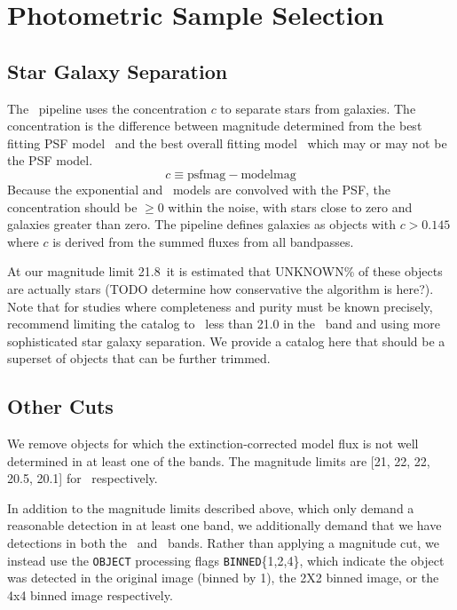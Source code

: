 \documentclass{emulateapj}
\newcommand{\rmax}{21.8}
\newcommand{\contam}{{\color{red} UNKNOWN}}
\begin{document}
\section{Photometric Sample Selection} \label{sec:select}

\subsection{Star Galaxy Separation}

The \photo\ pipeline uses the concentration $c$ to separate stars from
galaxies.  The concentration is the difference between magnitude determined
from the best fitting PSF model \psfmag\ and the best overall fitting model 
\modelmag\ which may or may not be the PSF model.
\begin{equation}
c \equiv \textrm{psfmag} - \textrm{modelmag}
\end{equation}
Because the exponential and \devauc\ models are convolved with the PSF, the
concentration should be $\ge 0$ within the noise, with stars close to zero and
galaxies greater than zero.  The pipeline defines galaxies as objects with $c >
0.145$ \citep{dr7classify} where $c$ is derived from the summed fluxes from all
bandpasses.  

At our magnitude limit \rmax\ it is estimated that \contam\% of these objects
are actually stars (TODO determine how conservative the algorithm is here?).
Note that for studies where completeness and purity must be known precisely,
\citet{ScrantonMag05} recommend limiting the catalog to \cmodelmag\ less than
21.0 in the \rmag\ band and using more sophisticated star galaxy separation. We
provide a catalog here that should be a superset of objects that can be further
trimmed.

\subsection{Other Cuts}

We remove objects for which the extinction-corrected model flux is not well
determined in at least one of the bands.  The magnitude limits are [21, 22, 22,
20.5, 20.1] for \allmag\ respectively.

In addition to the magnitude limits described above, which only demand a
reasonable detection in at least one band, we additionally demand that we have
detections in both the \rmag\ and \imag\ bands.  Rather than applying a
magnitude cut, we instead use the \texttt{OBJECT} processing flags
\texttt{BINNED}\{1,2,4\}, which indicate the object was detected in the original
image (binned by 1), the 2X2 binned image, or the 4x4 binned image respectively.
\end{document}
